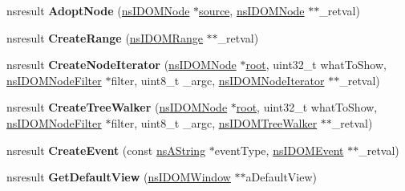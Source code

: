 \begin{DoxyCompactItemize}
\item 
\mbox{\label{interfacens_i_d_o_m_document_aeace58b58510599adb9398ad861db032}} 
nsresult {\bfseries Adopt\+Node} (\hyperlink{interfacens_i_d_o_m_node}{ns\+I\+D\+O\+M\+Node} $\ast$\hyperlink{structsource}{source}, \hyperlink{interfacens_i_d_o_m_node}{ns\+I\+D\+O\+M\+Node} $\ast$$\ast$\+\_\+retval)
\item 
\mbox{\label{interfacens_i_d_o_m_document_a48cedd89eeabe0e183028276192979c0}} 
nsresult {\bfseries Create\+Range} (\hyperlink{interfacens_i_d_o_m_range}{ns\+I\+D\+O\+M\+Range} $\ast$$\ast$\+\_\+retval)
\item 
\mbox{\label{interfacens_i_d_o_m_document_ae4be6ddb5b9bf0316c3ffa3964a2443c}} 
nsresult {\bfseries Create\+Node\+Iterator} (\hyperlink{interfacens_i_d_o_m_node}{ns\+I\+D\+O\+M\+Node} $\ast$\hyperlink{struct__root}{root}, uint32\+\_\+t what\+To\+Show, \hyperlink{interfacens_i_supports}{ns\+I\+D\+O\+M\+Node\+Filter} $\ast$filter, uint8\+\_\+t \+\_\+argc, \hyperlink{interfacens_i_supports}{ns\+I\+D\+O\+M\+Node\+Iterator} $\ast$$\ast$\+\_\+retval)
\item 
\mbox{\label{interfacens_i_d_o_m_document_aa12c94dd661b5af667567516daf66853}} 
nsresult {\bfseries Create\+Tree\+Walker} (\hyperlink{interfacens_i_d_o_m_node}{ns\+I\+D\+O\+M\+Node} $\ast$\hyperlink{struct__root}{root}, uint32\+\_\+t what\+To\+Show, \hyperlink{interfacens_i_supports}{ns\+I\+D\+O\+M\+Node\+Filter} $\ast$filter, uint8\+\_\+t \+\_\+argc, \hyperlink{interfacens_i_supports}{ns\+I\+D\+O\+M\+Tree\+Walker} $\ast$$\ast$\+\_\+retval)
\item 
\mbox{\label{interfacens_i_d_o_m_document_ae9166efcfcc762f819246bbc7f271640}} 
nsresult {\bfseries Create\+Event} (const \hyperlink{structns_string_container}{ns\+A\+String} $\ast$event\+Type, \hyperlink{interfacens_i_d_o_m_event}{ns\+I\+D\+O\+M\+Event} $\ast$$\ast$\+\_\+retval)
\item 
\mbox{\label{interfacens_i_d_o_m_document_ad06a82c0dd1c50c014743463dc91ca66}} 
nsresult {\bfseries Get\+Default\+View} (\hyperlink{interfacens_i_d_o_m_window}{ns\+I\+D\+O\+M\+Window} $\ast$$\ast$a\+Default\+View)

\end{DoxyCompactItemize}
